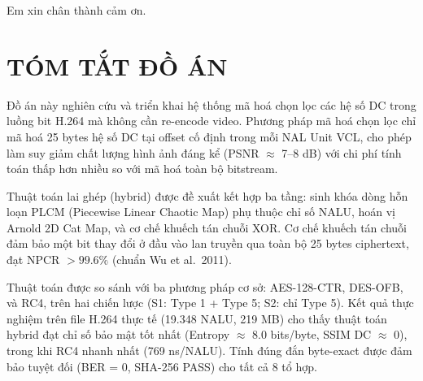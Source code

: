 \documentclass{thesis}
\begin{document}
Em xin chân thành cảm ơn.

\newpage
    \thispagestyle{empty}
        \clearpage
            \thispagestyle{empty}
                \cleardoublepage

\section*{TÓM TẮT ĐỒ ÁN}
    \thispagestyle{empty}
Đồ án này nghiên cứu và triển khai hệ thống mã hoá chọn lọc các hệ số DC trong luồng bit H.264 mà không cần re-encode video. Phương pháp mã hoá chọn lọc chỉ mã hoá 25 bytes hệ số DC tại offset cố định trong mỗi NAL Unit VCL, cho phép làm suy giảm chất lượng hình ảnh đáng kể (PSNR $\approx$ 7--8 dB) với chi phí tính toán thấp hơn nhiều so với mã hoá toàn bộ bitstream.

Thuật toán lai ghép (hybrid) được đề xuất kết hợp ba tầng: sinh khóa dòng hỗn loạn PLCM (Piecewise Linear Chaotic Map) phụ thuộc chỉ số NALU, hoán vị Arnold 2D Cat Map, và cơ chế khuếch tán chuỗi XOR. Cơ chế khuếch tán chuỗi đảm bảo một bit thay đổi ở đầu vào lan truyền qua toàn bộ 25 bytes ciphertext, đạt NPCR $> 99.6\%$ (chuẩn Wu et al.\ 2011).

Thuật toán được so sánh với ba phương pháp cơ sở: AES-128-CTR, DES-OFB, và RC4, trên hai chiến lược (S1: Type 1 + Type 5; S2: chỉ Type 5). Kết quả thực nghiệm trên file H.264 thực tế (19.348 NALU, 219 MB) cho thấy thuật toán hybrid đạt chỉ số bảo mật tốt nhất (Entropy $\approx$ 8.0 bits/byte, SSIM DC $\approx$ 0), trong khi RC4 nhanh nhất (769 ns/NALU). Tính đúng đắn byte-exact được đảm bảo tuyệt đối (BER = 0, SHA-256 PASS) cho tất cả 8 tổ hợp.

\thispagestyle{empty}
    \cleardoublepage

\tableofcontents
    \thispagestyle{empty}
        \newpage
            \thispagestyle{empty}
                \cleardoublepage

{\let\oldnumberline\numberline
    \renewcommand{\numberline}{Hình~\oldnumberline}
        \listoffigures}
\newpage

{\let\oldnumberline\numberline
    \renewcommand{\numberline}{Bảng~\oldnumberline}
        \listoftables}
\newpage
\end{document}
